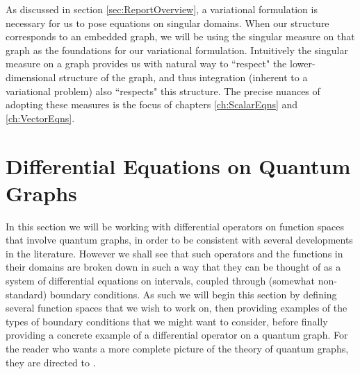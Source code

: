 As discussed in section \ref{sec:ReportOverview}, a variational formulation is necessary for us to pose equations on singular domains.
When our structure corresponds to an embedded graph, we will be using the singular measure on that graph as the foundations for our variational formulation.
Intuitively the singular measure on a graph provides us with natural way to ``respect" the lower-dimensional structure of the graph, and thus integration (inherent to a variational problem) also ``respects" this structure.
The precise nuances of adopting these measures is the focus of chapters \ref{ch:ScalarEqns} and \ref{ch:VectorEqns}.

\section{Differential Equations on Quantum Graphs} \label{sec:DEonQG}
In this section we will be working with differential operators on function spaces that involve quantum graphs, in order to be consistent with several developments in the literature.
However we shall see that such operators and the functions in their domains are broken down in such a way that they can be thought of as a system of differential equations on intervals, coupled through (somewhat non-standard) boundary conditions.
As such we will begin this section by defining several function spaces that we wish to work on, then providing examples of the types of boundary conditions that we might want to consider, before finally providing a concrete example of a differential operator on a quantum graph. 
For the reader who wants a more complete picture of the theory of quantum graphs, they are directed to \cite{berkolaiko2013introduction}. \newline

